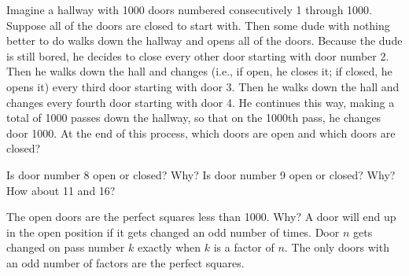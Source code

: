 
Imagine a hallway with 1000 doors numbered consecutively 1 through 1000.  Suppose all of the doors are closed to start with.  Then some dude with nothing better to do walks down the hallway and opens all of the doors.  Because the dude is still bored, he decides to close every other door starting with door number 2.  Then he walks down the hall and changes (i.e., if open, he closes it; if closed, he opens it) every third door starting with door 3.  Then he walks down the hall and changes every fourth door starting with door 4.  He continues this way, making a total of 1000 passes down the hallway, so that on the 1000th pass, he changes door 1000.  At the end of this process, which doors are open and which doors are closed? 

\begin{hint}
Is door number 8 open or closed?  Why?  Is door number 9 open or closed?  Why?  How about 11 and 16?
\end{hint}

\begin{solution}
The open doors are the perfect squares less than 1000.  Why?  A door will end up in the open position if it gets changed an odd number of times.  Door $n$ gets changed on pass number $k$ exactly when $k$ is a factor of $n$.  The only doors with an odd number of factors are the perfect squares.
\end{solution}

